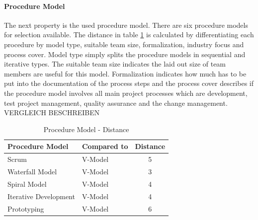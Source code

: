 \paragraph*{\textbf{Procedure Model}}
The next property is the used procedure model. There are six procedure models for selection available. The distance in table \ref{property:proceduremodel} is calculated by differentiating each procedure by model type, suitable team size, formalization, industry focus and process cover. Model type simply splits the procedure models in sequential and iterative types. The suitable team size indicates the laid out size of team members are useful for this model. Formalization indicates how much has to be put into the documentation of the process steps and the process cover describes if the procedure model involves all main project processes which are development, test project management, quality assurance and the change management.\\
VERGLEICH BESCHREIBEN
\begin{table}[h]
	\centering 
	\setlength{\tabcolsep}{4pt}
	\begin{tabular}{|l|l|c|}\hline
		Procedure Model			& Compared to 	&  Distance 	\\ \hline
		Scrum   				& V-Model		& 5      		\\ \hline
		Waterfall Model   		& V-Model 		& 3      		\\ \hline
		Spiral Model   			& V-Model 		& 4     		\\ \hline
		Iterative Development   & V-Model 		& 4     		\\ \hline
		Prototyping  			& V-Model 		& 6     		\\ \hline
	\end{tabular} 
	\caption{Procedure Model - Distance} 
	\label{property:proceduremodel} 
\end{table}

